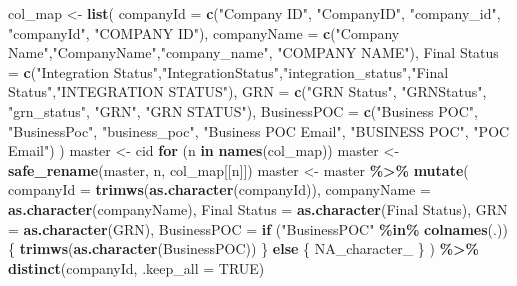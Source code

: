 \documentclass[
]{article}
\newenvironment{Shaded}{\begin{snugshade}}{\end{snugshade}}
\newcommand{\AttributeTok}[1]{\textcolor[rgb]{0.13,0.29,0.53}{#1}}
\newcommand{\ConstantTok}[1]{\textcolor[rgb]{0.56,0.35,0.01}{#1}}
\newcommand{\ControlFlowTok}[1]{\textcolor[rgb]{0.13,0.29,0.53}{\textbf{#1}}}
\newcommand{\FunctionTok}[1]{\textcolor[rgb]{0.13,0.29,0.53}{\textbf{#1}}}
\newcommand{\NormalTok}[1]{#1}
\newcommand{\OtherTok}[1]{\textcolor[rgb]{0.56,0.35,0.01}{#1}}
\newcommand{\SpecialCharTok}[1]{\textcolor[rgb]{0.81,0.36,0.00}{\textbf{#1}}}
\newcommand{\StringTok}[1]{\textcolor[rgb]{0.31,0.60,0.02}{#1}}
\begin{document}
\begin{Shaded}
\begin{Highlighting}[]
\NormalTok{      col\_map }\OtherTok{\textless{}{-}} \FunctionTok{list}\NormalTok{(}
        \AttributeTok{companyId      =} \FunctionTok{c}\NormalTok{(}\StringTok{"Company ID"}\NormalTok{, }\StringTok{"CompanyID"}\NormalTok{,  }\StringTok{"company\_id"}\NormalTok{,        }\StringTok{"companyId"}\NormalTok{,     }\StringTok{"COMPANY ID"}\NormalTok{),}
        \AttributeTok{companyName    =} \FunctionTok{c}\NormalTok{(}\StringTok{"Company Name"}\NormalTok{,}\StringTok{"CompanyName"}\NormalTok{,}\StringTok{"company\_name"}\NormalTok{,       }\StringTok{"COMPANY NAME"}\NormalTok{),}
        \StringTok{\textasciigrave{}}\AttributeTok{Final Status}\StringTok{\textasciigrave{}} \OtherTok{=} \FunctionTok{c}\NormalTok{(}\StringTok{"Integration Status"}\NormalTok{,}\StringTok{"IntegrationStatus"}\NormalTok{,}\StringTok{"integration\_status"}\NormalTok{,}\StringTok{"Final Status"}\NormalTok{,}\StringTok{"INTEGRATION STATUS"}\NormalTok{),}
        \AttributeTok{GRN            =} \FunctionTok{c}\NormalTok{(}\StringTok{"GRN Status"}\NormalTok{, }\StringTok{"GRNStatus"}\NormalTok{,  }\StringTok{"grn\_status"}\NormalTok{,        }\StringTok{"GRN"}\NormalTok{,           }\StringTok{"GRN STATUS"}\NormalTok{),}
        \AttributeTok{BusinessPOC    =} \FunctionTok{c}\NormalTok{(}\StringTok{"Business POC"}\NormalTok{, }\StringTok{"BusinessPoc"}\NormalTok{, }\StringTok{"business\_poc"}\NormalTok{, }\StringTok{"Business POC Email"}\NormalTok{, }\StringTok{"BUSINESS POC"}\NormalTok{, }\StringTok{"POC Email"}\NormalTok{)}
\NormalTok{      )}
\NormalTok{      master }\OtherTok{\textless{}{-}}\NormalTok{ cid}
      \ControlFlowTok{for}\NormalTok{ (n }\ControlFlowTok{in} \FunctionTok{names}\NormalTok{(col\_map)) master }\OtherTok{\textless{}{-}} \FunctionTok{safe\_rename}\NormalTok{(master, n, col\_map[[n]])}
\NormalTok{      master }\OtherTok{\textless{}{-}}\NormalTok{ master }\SpecialCharTok{\%\textgreater{}\%}
        \FunctionTok{mutate}\NormalTok{(}
          \AttributeTok{companyId      =} \FunctionTok{trimws}\NormalTok{(}\FunctionTok{as.character}\NormalTok{(companyId)),}
          \AttributeTok{companyName    =} \FunctionTok{as.character}\NormalTok{(companyName),}
          \StringTok{\textasciigrave{}}\AttributeTok{Final Status}\StringTok{\textasciigrave{}} \OtherTok{=} \FunctionTok{as.character}\NormalTok{(}\StringTok{\textasciigrave{}}\AttributeTok{Final Status}\StringTok{\textasciigrave{}}\NormalTok{),}
          \AttributeTok{GRN            =} \FunctionTok{as.character}\NormalTok{(GRN),}
          \AttributeTok{BusinessPOC    =} \ControlFlowTok{if}\NormalTok{ (}\StringTok{"BusinessPOC"} \SpecialCharTok{\%in\%} \FunctionTok{colnames}\NormalTok{(.)) \{}
            \FunctionTok{trimws}\NormalTok{(}\FunctionTok{as.character}\NormalTok{(BusinessPOC))}
\NormalTok{          \} }\ControlFlowTok{else}\NormalTok{ \{}
            \ConstantTok{NA\_character\_}
\NormalTok{          \}}
\NormalTok{        ) }\SpecialCharTok{\%\textgreater{}\%}
        \FunctionTok{distinct}\NormalTok{(companyId, }\AttributeTok{.keep\_all =} \ConstantTok{TRUE}\NormalTok{)}
      

\end{Highlighting}
\end{Shaded}
\end{document}
